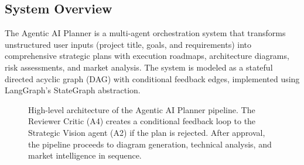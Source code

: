 \documentclass[journal]{IEEEtran}
\begin{document}
\subsection{System Overview}

The Agentic AI Planner is a multi-agent orchestration system that transforms unstructured user inputs (project title, goals, and requirements) into comprehensive strategic plans with execution roadmaps, architecture diagrams, risk assessments, and market analysis. The system is modeled as a stateful directed acyclic graph (DAG) with conditional feedback edges, implemented using LangGraph's StateGraph abstraction.

\begin{figure}[!t]
    \centering
    \caption{High-level architecture of the Agentic AI Planner pipeline. The Reviewer Critic (A4) creates a conditional feedback loop to the Strategic Vision agent (A2) if the plan is rejected. After approval, the pipeline proceeds to diagram generation, technical analysis, and market intelligence in sequence.}
    \label{fig:architecture}
\end{figure}
\end{document}
